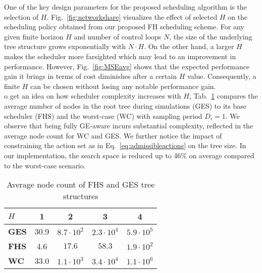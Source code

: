 One of the key design parameters for the proposed scheduling algorithm is the
selection of $H$. Fig.~\ref{fig:networkshare} visualizes the effect of selected
$H$ on the scheduling policy obtained from our proposed  FH scheduling scheme.
For any given finite horizon $H$ and number of control loops $N$, the size of
the underlying tree structure grows exponentially with $N\cdot H$. On the other
hand, a larger $H$ makes the scheduler more farsighted which may lead to an
improvement in performance. However, Fig.~\ref{fig:MSEavg} shows that the
expected performance gain it brings in terms of cost diminishes after a certain
$H$ value. Consequently, a finite $H$ can be chosen without losing any notable
performance gain. \\
o get an idea on how scheduler complexity increases with $H$,
Tab.~\ref{tab:complexity} compares the average number of nodes in the root tree
during simulations (GES) to its base scheduler (FHS) and the worst-case (WC)
with sampling period $D_i=1$. We observe that being fully GE-aware incurs
substantial complexity, reflected in the average node count for WC and GES. We
further notice the impact of constraining the action set as in
Eq.~\eqref{eq:admissibleactions} on the tree size. In our implementation, the
search space is reduced up to 46\% on average compared to the worst-case
scenario.

\begin{table}[htb]
  \begin{center}
  \begin{tabular}{|l|c|c|c|c|}
  \hline
  $H$ & 1 & 2 & 3 & 4 \\ 
  \hline \hline
  \textbf{GES} & 30.9 & $8.7\cdot10^2$ & $2.3\cdot10^4$ & $5.9\cdot10^5$ \\
  \textbf{FHS} & 4.6 & $17.6$ & $58.3$ & $1.9\cdot10^2$ \\
  \textbf{WC} & 33.0 & $1.1\cdot10^3$ & $3.4\cdot10^4$ & $1.1\cdot10^6$ \\
  \hline
  \end{tabular}
  \caption{Average node count of FHS and GES tree structures}
  \label{tab:complexity}
  \end{center}
\end{table}

